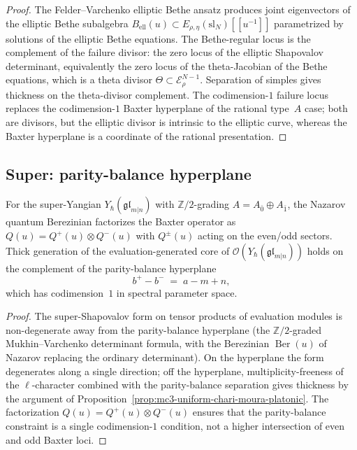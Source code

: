 \begin{proof}
The Felder--Varchenko elliptic Bethe ansatz produces joint
eigenvectors of the elliptic Bethe subalgebra
$B_{\mathrm{ell}}(u) \subset
E_{\rho,\eta}(\mathrm{sl}_N)[[u^{-1}]]$ parametrized by solutions
of the elliptic Bethe equations. The Bethe-regular locus is the
complement of the failure divisor: the zero locus of the elliptic
Shapovalov determinant, equivalently the zero locus of the
theta-Jacobian of the Bethe equations, which is a theta divisor
$\Theta \subset \mathcal{E}_\rho^{N-1}$. Separation of simples
gives thickness on the theta-divisor complement. The
codimension-$1$ failure locus replaces the codimension-$1$ Baxter
hyperplane of the rational type~$A$ case; both are divisors, but
the elliptic divisor is intrinsic to the elliptic curve, whereas
the Baxter hyperplane is a coordinate of the rational
presentation.
\end{proof}

\subsection{Super: parity-balance hyperplane}

\begin{proposition}
\label{prop:mc3-super-parity-balance-platonic}
%
%
%
For the super-Yangian $Y_\hbar(\mathfrak{gl}_{m|n})$ with
$\mathbb{Z}/2$-grading $A = A_{\bar0} \oplus A_{\bar1}$, the
Nazarov quantum Berezinian factorizes the Baxter operator as
$Q(u) = Q^+(u) \otimes Q^-(u)$ with $Q^\pm(u)$ acting on the
even/odd sectors. Thick generation of the evaluation-generated
core of $\mathcal{O}(Y_\hbar(\mathfrak{gl}_{m|n}))$ holds on the
complement of the parity-balance hyperplane
\[
 b^+ - b^- \;=\; a - m + n,
\]
which has codimension~$1$ in spectral parameter space.
\end{proposition}

\begin{proof}
The super-Shapovalov form on tensor products of evaluation modules
is non-degenerate away from the parity-balance hyperplane (the
$\mathbb{Z}/2$-graded Mukhin--Varchenko determinant formula, with
the Berezinian $\operatorname{Ber}(u)$ of Nazarov replacing the
ordinary determinant). On the hyperplane the form degenerates
along a single direction; off the hyperplane,
multiplicity-freeness of the $\ell$-character combined with the
parity-balance separation gives thickness by the argument of
Proposition~\ref{prop:mc3-uniform-chari-moura-platonic}. The factorization
$Q(u) = Q^+(u) \otimes Q^-(u)$ ensures that the parity-balance
constraint is a single codimension-$1$ condition, not a higher
intersection of even and odd Baxter loci.
\end{proof}


